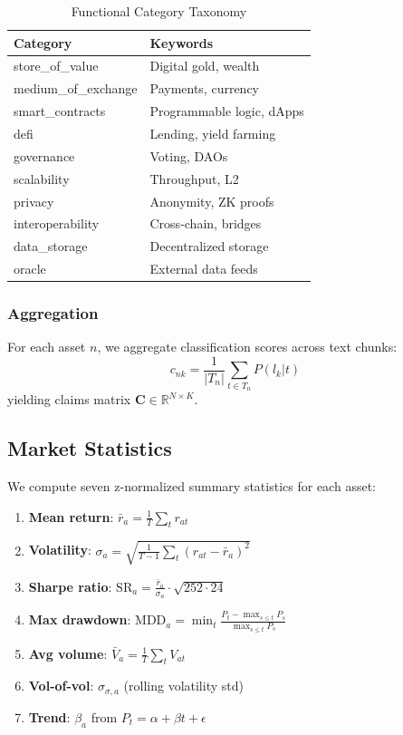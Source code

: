 \documentclass[11pt,twocolumn]{article}
\begin{document}
\begin{table}[t]
\centering
\small
\caption{Functional Category Taxonomy}
\label{tab:taxonomy}
\begin{tabular}{@{}p{2.2cm}p{4cm}@{}}
\toprule
\textbf{Category} & \textbf{Keywords} \\
\midrule
store\_of\_value & Digital gold, wealth \\
medium\_of\_exchange & Payments, currency \\
smart\_contracts & Programmable logic, dApps \\
defi & Lending, yield farming \\
governance & Voting, DAOs \\
scalability & Throughput, L2 \\
privacy & Anonymity, ZK proofs \\
interoperability & Cross-chain, bridges \\
data\_storage & Decentralized storage \\
oracle & External data feeds \\
\bottomrule
\end{tabular}
\end{table}

\subsubsection{Aggregation}

For each asset $n$, we aggregate classification scores across text chunks:
\begin{equation}
c_{nk} = \frac{1}{|T_n|} \sum_{t \in T_n} P(l_k | t)
\end{equation}
yielding claims matrix $\mathbf{C} \in \mathbb{R}^{N \times K}$.

\subsection{Market Statistics}

We compute seven z-normalized summary statistics for each asset:

\begin{enumerate}
    \item \textbf{Mean return}: $\bar{r}_a = \frac{1}{T} \sum_t r_{at}$
    \item \textbf{Volatility}: $\sigma_a = \sqrt{\frac{1}{T-1} \sum_t (r_{at} - \bar{r}_a)^2}$
    \item \textbf{Sharpe ratio}: $\text{SR}_a = \frac{\bar{r}_a}{\sigma_a} \cdot \sqrt{252 \cdot 24}$
    \item \textbf{Max drawdown}: $\text{MDD}_a = \min_t \frac{P_t - \max_{s \leq t} P_s}{\max_{s \leq t} P_s}$
    \item \textbf{Avg volume}: $\bar{V}_a = \frac{1}{T} \sum_t V_{at}$
    \item \textbf{Vol-of-vol}: $\sigma_{\sigma,a}$ (rolling volatility std)
    \item \textbf{Trend}: $\beta_a$ from $P_t = \alpha + \beta t + \epsilon$
\end{enumerate}
\end{document}
